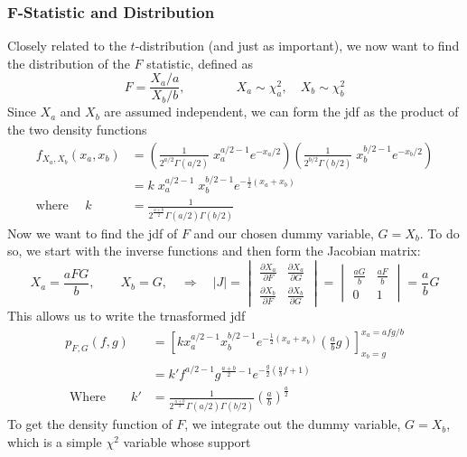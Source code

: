 \documentclass[a4paper,12pt]{scrartcl}
\begin{document}
\newpage
\subsubsection{F-Statistic and Distribution}

Closely related to the $t$-distribution (and just as important),
we now want to find the distribution of the $F$ statistic, defined as
\[ F = \frac{ X_a / a}{X_b / b},\qquad\qquad X_a \sim \chi^2_a, \quad
   X_b \sim \chi^2_b \]
Since $X_a$ and $X_b$ are assumed independent, 
we can form the jdf as the product of the two density functions
\begin{align*}
   f_{X_a, X_b}(x_a, x_b) &= \left(\frac{1}{2^{a/2} \Gamma(a/2)}
      \; x_a^{a/2 -1} e^{-x_a/2 }\right) \left(
      \frac{1}{2^{b/2}  \Gamma(b/2)} \;
      x_b^{b/2 -1} e^{- x_b /2} \right)\\
   &= k \; x_a^{a/2 -1} \; x_b^{b/2 -1} e^{-\frac{1}{2}(x_a + x_b)} \\
   \text{where } \quad k &= \frac{1}{ 2^{\frac{a+b}{2}} \Gamma(a/2) 
      \Gamma(b/2)}
\end{align*}
Now we want to find the jdf of $F$ and our chosen dummy variable,
$G=X_b$. To do so, we start with the inverse functions and 
then form the Jacobian matrix:
   \[ X_a = \frac{a FG}{b}, \qquad X_b = G, \quad\Rightarrow \quad
     |J| = \begin{vmatrix} \frac{\partial X_a}{\partial F} &
      \frac{\partial X_a}{\partial G} \\ 
      \frac{\partial X_b}{\partial F} &
      \frac{\partial X_b}{\partial G} \end{vmatrix} =
      \begin{vmatrix}
	 \frac{a G}{b} & \frac{a F}{b} \\ 0 & 1 
      \end{vmatrix} 
      = \frac{a}{b} G
      \]
This allows us to write the trnasformed jdf 
\begin{align*}
   p_{F,G}(f,g) &= \left[ 
      k x_a^{a/2 -1} x_b^{b/2 -1} e^{-\frac{1}{2}(x_a + x_b)} 
      \left( \frac{a}{b} g\right) \right]^{x_a = a f g/b}_{x_b = g}\\
   &= k' f^{a/2 -1} g^{\frac{a+b}{2}-1} e^{-\frac{g}{2}\left(
      \frac{a}{b}f +1 \right)} \\
   \text{ Where} \qquad k' &= \frac{1}{ 2^{\frac{a+b}{2}} \Gamma(a/2) 
      \Gamma(b/2)} \left( \frac{a}{b}\right)^{\frac{a}{2}} 
\end{align*}
To get the density function of $F$, we integrate out the dummy
variable, $G=X_b$, which is a simple $\chi^2$ variable whose support
\end{document}
